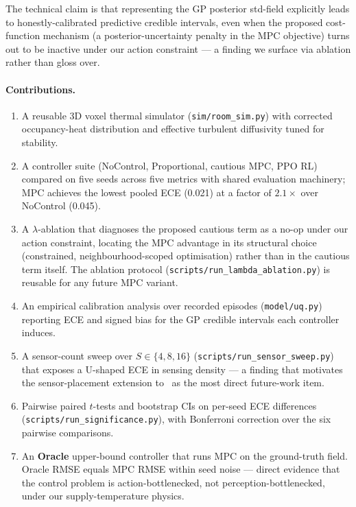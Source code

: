 \documentclass[11pt,letterpaper]{article}
\begin{document}
The technical claim is that representing the GP posterior std-field
explicitly leads to honestly-calibrated predictive credible intervals,
even when the proposed cost-function mechanism (a posterior-uncertainty
penalty in the MPC objective) turns out to be inactive under our action
constraint --- a finding we surface via ablation rather than gloss over.

\paragraph{Contributions.}
\begin{enumerate}
\itemsep0pt
\item A reusable 3D voxel thermal simulator
      (\texttt{sim/room\_sim.py}) with corrected occupancy-heat distribution
      and effective turbulent diffusivity tuned for stability.
\item A controller suite (NoControl, Proportional, cautious MPC, PPO RL)
      compared on five seeds across five metrics with shared evaluation
      machinery; MPC achieves the lowest pooled ECE (0.021) at a
      factor of $2.1\times$ over NoControl (0.045).
\item A $\lambda$-ablation that diagnoses the proposed cautious term as
      a no-op under our action constraint, locating the MPC advantage
      in its structural choice (constrained, neighbourhood-scoped
      optimisation) rather than in the cautious term itself. The ablation
      protocol (\texttt{scripts/run\_lambda\_ablation.py}) is reusable
      for any future MPC variant.
\item An empirical calibration analysis over recorded episodes
      (\texttt{model/uq.py}) reporting ECE and signed bias for the GP
      credible intervals each controller induces.
\item A sensor-count sweep over $S \in \{4, 8, 16\}$
      (\texttt{scripts/run\_sensor\_sweep.py}) that exposes a U-shaped
      ECE in sensing density --- a finding that motivates the
      sensor-placement extension to~\citet{krause2008} as the most
      direct future-work item.
\item Pairwise paired $t$-tests and bootstrap CIs on per-seed ECE
      differences (\texttt{scripts/run\_significance.py}), with
      Bonferroni correction over the six pairwise comparisons.
\item An \textbf{Oracle} upper-bound controller that runs MPC on the
      ground-truth field. Oracle RMSE equals MPC RMSE within seed
      noise --- direct evidence that the control problem is
      action-bottlenecked, not perception-bottlenecked, under our
      supply-temperature physics.
\end{enumerate}
\end{document}
